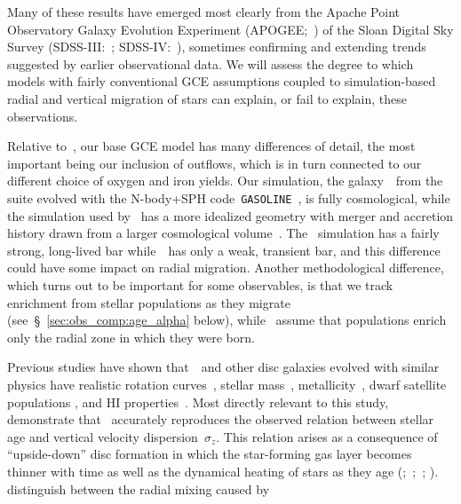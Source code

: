 \documentclass[draft2.tex]{subfiles}
\begin{document}
Many of these results have emerged most clearly from the Apache Point 
Observatory Galaxy Evolution Experiment (APOGEE;~\citealp{Majewski2017}) of 
the Sloan Digital Sky Survey (SDSS-III:~\citealp{Eisenstein2011}; 
SDSS-IV:~\citealp{Blanton2017}), sometimes confirming and extending trends 
suggested by earlier observational data. We will assess the degree to which 
models with fairly conventional GCE assumptions coupled to simulation-based 
radial and vertical migration of stars can explain, or fail to explain, these 
observations. 
\par 
Relative to~\citet{Minchev2013, Minchev2014}, our base GCE model has many 
differences of detail, the most important being our inclusion of outflows, 
which is in turn connected to our different choice of oxygen and iron yields. 
Our simulation, the galaxy~\hsim~from the~\citet{Christensen2012} 
suite evolved with the N-body+SPH code~\texttt{GASOLINE}~\citep{Wadsley2004}, 
is fully cosmological, while the simulation used by~\citet{Minchev2013, 
Minchev2014} has a more idealized geometry with merger and accretion history 
drawn from a larger cosmological volume~\citep{Martig2012}. 
The~\citet{Minchev2013, Minchev2014} simulation has a fairly strong, 
long-lived bar while~\hsim~has only a weak, transient bar, and this difference 
could have some impact on radial migration. 
Another methodological difference, which turns out to be important for some 
observables, is that we track enrichment from stellar populations as they 
migrate (see~\S~\ref{sec:obs_comp:age_alpha} below), while~\citet{Minchev2013, 
Minchev2014} assume that populations enrich only the radial zone in which they 
were born. 
\par 
Previous studies have shown that~\hsim~and other disc galaxies evolved with 
similar physics have realistic rotation curves~\citep{Governato2012, 
Christensen2014a, Christensen2014b}, stellar mass~\citep{Munshi2013}, 
metallicity~\citep{Christensen2016}, dwarf satellite populations 
\citep{Zolotov2012, Brooks2014}, and HI properties~\citep{Brooks2017}. 
Most directly relevant to this study,~\citet{Bird2020} demonstrate that 
\hsim~accurately reproduces the observed relation between stellar age and 
vertical velocity dispersion~$\sigma_z$. 
This relation arises as a consequence of ``upside-down'' disc formation in 
which the star-forming gas layer becomes thinner with time as well as the 
dynamical heating of stars as they age (\citealp*{Bournaud2009a, 
Bournaud2009b, Forbes2012};~\citealp{Bird2013};~\citealp*{Vincenzo2019}; 
\citealp{Yu2021}). 
\citet{Schoenrich2009a} distinguish between the radial mixing caused by 
\end{document}
